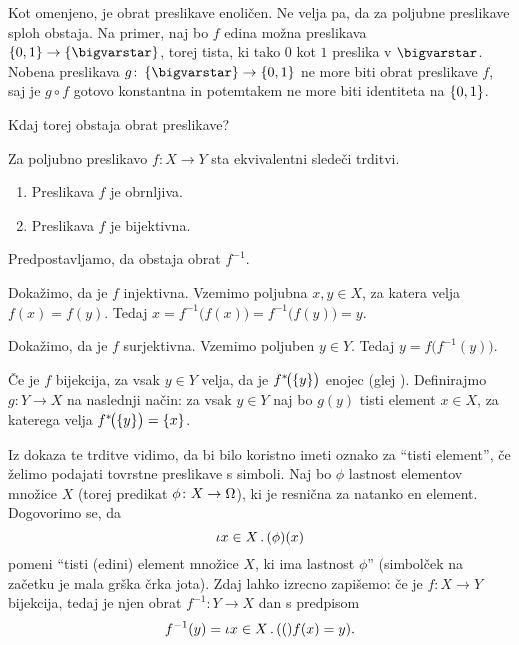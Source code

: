 Kot omenjeno, je obrat preslikave enoličen. Ne velja pa, da za poljubne preslikave sploh obstaja. Na primer, naj bo $f$ edina možna preslikava $\set{0, 1} \to \set{\unit}$, torej tista, ki tako $0$ kot $1$ preslika v $\unit$. Nobena preslikava $g\colon \set{\unit} \to \set{0, 1}$ ne more biti obrat preslikave $f$, saj je $g \circ f$ gotovo konstantna in potemtakem ne more biti identiteta na $\set{0, 1}$.

Kdaj torej obstaja obrat preslikave?

\begin{trditev}
Za poljubno preslikavo $f\colon X \to Y$ sta ekvivalentni sledeči trditvi.
\begin{enumerate}
\item
Preslikava $f$ je obrnljiva.
\item
Preslikava $f$ je bijektivna.
\end{enumerate}
\end{trditev}

\begin{dokaz}
\begin{implproof}{1}{2}
Predpostavljamo, da obstaja obrat $f^{-1}$.

Dokažimo, da je $f$ injektivna. Vzemimo poljubna $x, y \in X$, za katera velja $f(x) = f(y)$. Tedaj $x = f^{-1}\big(f(x)\big) = f^{-1}\big(f(y)\big) = y$.

Dokažimo, da je $f$ surjektivna. Vzemimo poljuben $y \in Y$. Tedaj $y = f\big(f^{-1}(y)\big)$.
\end{implproof}
\begin{implproof}{2}{1}
Če je $f$ bijekcija, za vsak $y \in Y$ velja, da je $\pim[1]{f}{\set{y}}$ enojec (glej ). Definirajmo $g\colon Y \to X$ na naslednji način: za vsak $y \in Y$ naj bo $g(y)$ tisti element $x \in X$, za katerega velja $\pim[1]{f}{\set{y}} = \set{x}$. 
\end{implproof}
\end{dokaz}

Iz dokaza te trditve vidimo, da bi bilo koristno imeti oznako za ``tisti element'', če želimo podajati tovrstne preslikave s simboli. Naj bo $\phi$ lastnost elementov množice $X$ (torej predikat $\phi\colon X \to \Omega$), ki je resnična za natanko en element. Dogovorimo se, da
\[\that{x \in X} \phi(x)\]
pomeni ``tisti (edini) element množice $X$, ki ima lastnost $\phi$'' (simbolček na začetku je mala grška črka jota). Zdaj lahko izrecno zapišemo: če je $f\colon X \to Y$ bijekcija, tedaj je njen obrat $f^{-1}\colon Y \to X$ dan s predpisom
\[f^{-1}(y) = \that{x \in X} (f(x) = y).\]

